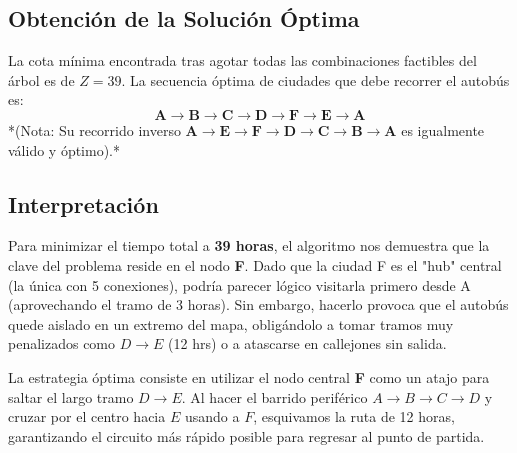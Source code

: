 \documentclass[10pt,a4paper]{article}
\begin{document}
\subsection{Obtención de la Solución Óptima}

La cota mínima encontrada tras agotar todas las combinaciones factibles del árbol es de $Z = 39$.
La secuencia óptima de ciudades que debe recorrer el autobús es:
\[ \mathbf{A \to B \to C \to D \to F \to E \to A} \]
*(Nota: Su recorrido inverso $\mathbf{A \to E \to F \to D \to C \to B \to A}$ es igualmente válido y óptimo).*

\subsection{Interpretación}

Para minimizar el tiempo total a \textbf{39 horas}, el algoritmo nos demuestra que la clave del problema reside en el nodo \textbf{F}. Dado que la ciudad F es el "hub" central (la única con 5 conexiones), podría parecer lógico visitarla primero desde A (aprovechando el tramo de 3 horas). Sin embargo, hacerlo provoca que el autobús quede aislado en un extremo del mapa, obligándolo a tomar tramos muy penalizados como $D \to E$ (12 hrs) o a atascarse en callejones sin salida.

La estrategia  óptima consiste en utilizar el nodo central \textbf{F} como un atajo
 para saltar el largo tramo $D \to E$. Al hacer el barrido periférico $A \to B \to C \to D$ y 
 cruzar por el centro hacia $E$ usando a $F$, 
 esquivamos la ruta de 12 horas, garantizando el circuito más rápido posible para regresar al punto de partida.
\end{document}
